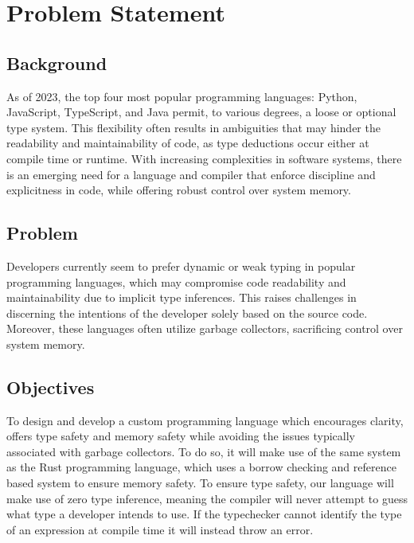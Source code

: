 \section{Problem Statement}
\label{sec:ProblemStatement}

\subsection{Background}

As of 2023, the top four most popular programming languages: Python, JavaScript,
TypeScript, and Java permit, to various degrees, a loose or optional type
system\cite{STACK}. This flexibility often results in ambiguities that may hinder the
readability and maintainability of code, as type deductions occur either at compile
time or runtime. With increasing complexities in software systems, there is an
emerging need for a language and compiler that enforce discipline and explicitness in
code, while offering robust control over system memory.

\subsection{Problem}

Developers currently seem to prefer dynamic or weak typing in popular programming
languages, which may compromise code readability and maintainability due to implicit
type inferences. This raises challenges in discerning the intentions of the developer
solely based on the source code. Moreover, these languages often utilize garbage
collectors, sacrificing control over system memory.

\subsection{Objectives}

To design and develop a custom programming language which encourages clarity, offers
type safety and memory safety while avoiding the issues typically associated with
garbage collectors. To do so, it will make use of the same system as the Rust programming
language, which uses a borrow checking and reference based system to ensure memory
safety\cite{RUST}. To ensure type safety, our language will make use of zero type
inference, meaning the compiler will never attempt to guess what type a developer
intends to use. If the typechecker cannot identify the type of an expression at
compile time it will instead throw an error. \\
